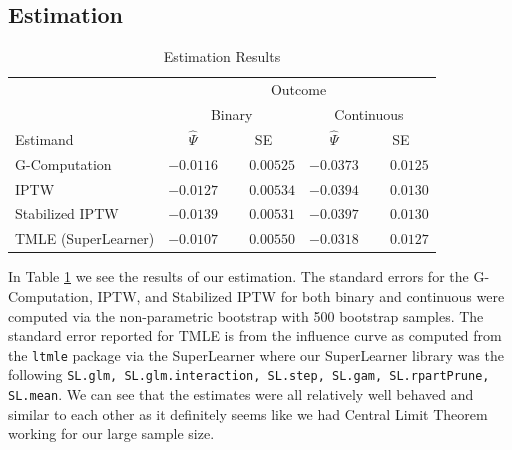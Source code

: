 \documentclass[english, 12pt]{article}
\begin{document}
\subsection{Estimation}
\begin{table}
\begin{center}
\begin{tabular}{lcccc}
\toprule
 & \multicolumn{4}{c}{Outcome} \\ \cmidrule(lr){2-5}
 & \multicolumn{2}{c}{Binary} & \multicolumn{2}{c}{Continuous} \\ \cmidrule(lr){2-3}\cmidrule(lr){4-5}
Estimand  & $\hat{\Psi}$ & SE & $\hat{\Psi}$ & \multicolumn{1}{c}{SE} \\ 
\midrule
G-Computation  & $-0.0116$ & $\phantom{-}0.00525$ & $-0.0373$ & $\phantom{-}0.0125$ \\
IPTW  & $-0.0127$ & $\phantom{-}0.00534$ & $-0.0394$ & $\phantom{-}0.0130$ \\
Stabilized IPTW  & $-0.0139$ & $\phantom{-}0.00531$ & $-0.0397$ & $\phantom{-}0.0130$ \\
TMLE (SuperLearner)  & $-0.0107$ & $\phantom{-}0.00550$ & $-0.0318$ & $\phantom{-}0.0127$ \\
\bottomrule 
\end{tabular}

\caption{Estimation Results}
\label{tab:estimation}
\end{center}
\end{table}

In Table \ref{tab:estimation} we see the results of our estimation. The standard errors for the G-Computation, IPTW, and Stabilized IPTW for both binary and continuous were computed via the non-parametric bootstrap with 500 bootstrap samples. The standard error reported for TMLE is from the influence curve as computed from the \texttt{ltmle} package via the SuperLearner where our SuperLearner library was the following \texttt{SL.glm, SL.glm.interaction, SL.step, SL.gam, SL.rpartPrune, SL.mean}. We can see that the estimates were all relatively well behaved and similar to each other as it definitely seems like we had Central Limit Theorem working for our large sample size. 
\end{document}
